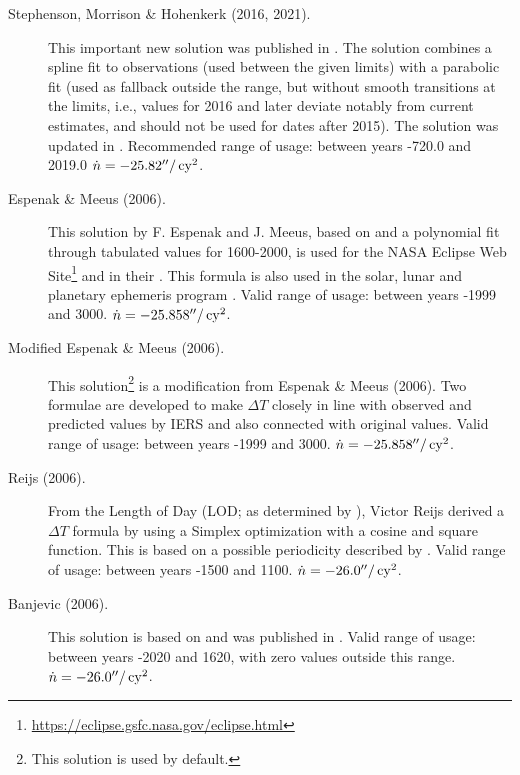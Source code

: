 \begin{description}
\item[Stephenson, Morrison \& Hohenkerk (2016, 2021).] This important new solution was published 
  in . 
  The solution combines a spline fit to observations (used between the given limits) 
  with a parabolic fit (used as fallback outside the range, but without smooth transitions at the limits, i.e., 
  values for 2016 and later deviate notably from current estimates, and should not be used for dates after 2015).
  The solution was updated in .
  Recommended range of usage: between years -720.0 and 2019.0 $\dot{n}=-25.82''/\,\mathrm{cy}^2$.
  
\item[Espenak \& Meeus (2006).] This solution by F. Espenak and J. Meeus, based on 
	\citet{2004JHA....35..327M} and a polynomial fit
  through tabulated values for 1600-2000, is used for the NASA Eclipse
  Web Site\footnote{\url{https://eclipse.gsfc.nasa.gov/eclipse.html}}
  and in their . This formula is also used in the
  solar, lunar and planetary ephemeris program . Valid
  range of usage: between years -1999 and
  3000. $\dot{n}=-25.858''/\,\mathrm{cy}^2$.

\item[Modified Espenak \& Meeus (2006).] This solution\footnote{This solution
  is used by default.} is a modification from Espenak \& Meeus (2006). Two formulae are developed to make $\Delta T$
  closely in line with observed and predicted values by IERS and also connected with original values.
  Valid range of usage: between years -1999 and 3000. $\dot{n}=-25.858''/\,\mathrm{cy}^2$.

\item[Reijs (2006).] From the Length of Day (LOD; as determined by
  \citet{2004JHA....35..327M}), Victor Reijs
  derived a $\Delta T$ formula by using a Simplex optimization with a
  cosine and square
  function.
  This is based on a possible periodicity described by
  \citet{2004JHA....35..327M}. Valid range of usage: between
  years -1500 and 1100. $\dot{n}=-26.0''/\,\mathrm{cy}^2$.

\item[Banjevic (2006).] This solution is based on
  \citet{1984RSPTA.313...47S} and was
  published in . Valid range of usage: between
  years -2020 and 1620, with zero values outside this range. 
  $\dot{n}=-26.0''/\,\mathrm{cy}^2$.


\end{description}
